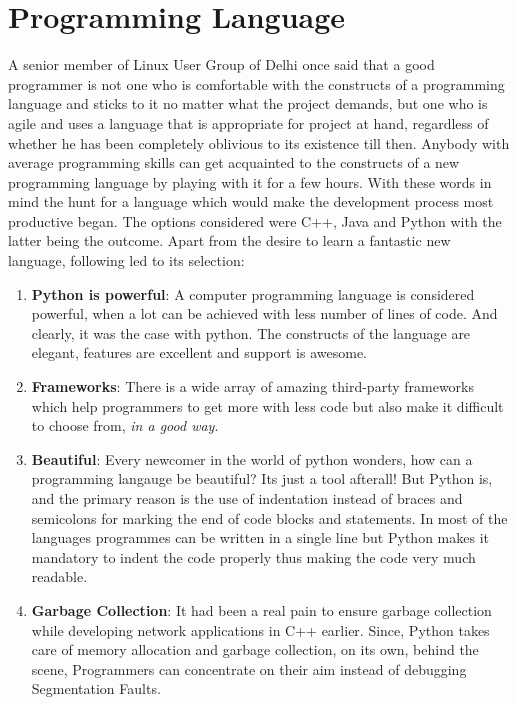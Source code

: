 \section {Programming Language}
\label{sec:python}
A senior member of Linux User Group of Delhi once said that a good programmer is not one who is comfortable with the constructs of a programming language and sticks to it no matter what the project demands, but one who is agile and uses a language that is appropriate for project at hand, regardless of whether he has been completely oblivious to its existence till then. Anybody with average programming skills can get acquainted to the constructs of a new programming language by playing with it for a few hours. 
With these words in mind the hunt for a language which would make the development process most productive began. The options considered were C++, Java and Python with the latter being the outcome. Apart from the desire to learn a fantastic new language, following led to its selection:
\begin{enumerate}
\item \textbf{Python is powerful}: A computer programming language is considered powerful, when a lot can be achieved with less number of lines of code. And clearly, it was the case with python. The constructs of the language are elegant, features are excellent and support is awesome.
\item \textbf{Frameworks}: There is a wide array of amazing third-party frameworks which help programmers to get more with less code but also make it difficult to choose from, \emph{in a good way}.
\item \textbf{Beautiful}: Every newcomer in the world of python wonders, how can a programming langauge be beautiful? Its just a tool afterall! But Python is, and the primary reason is the use of indentation instead of braces and semicolons for marking the end of code blocks and statements. In most of the languages programmes can be written in a single line but Python makes it mandatory to indent the code properly thus making the code very much readable.
\item \textbf{Garbage Collection}: It had been a real pain to ensure garbage collection while developing network applications in C++ earlier. Since, Python takes care of memory allocation and garbage collection, on its own, behind the scene, Programmers can concentrate on their aim instead of debugging Segmentation Faults.
\end{enumerate}

